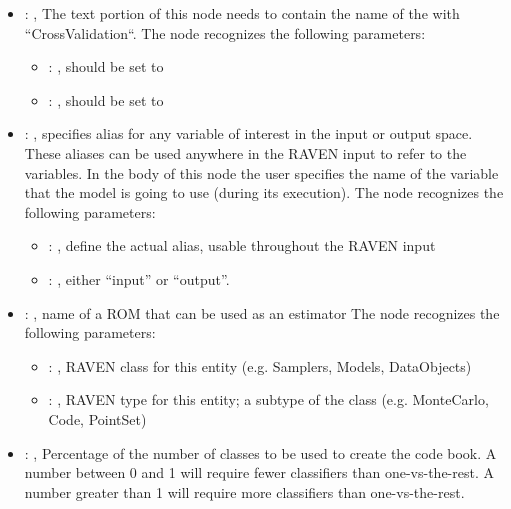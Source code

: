 \begin{itemize}
    \item {}: , 
      The text portion of this node needs to contain the name of the  with
               ``CrossValidation``.
      The  node recognizes the following parameters:
        \begin{itemize}
          \item {}: , 
            should be set to 
          \item {}: , 
            should be set to 
      \end{itemize}

    \item {}: , 
      specifies alias for         any variable of interest in the input or output space. These
      aliases can be used anywhere in the RAVEN input to         refer to the variables. In the body
      of this node the user specifies the name of the variable that the model is going to use
      (during its execution).
      The  node recognizes the following parameters:
        \begin{itemize}
          \item {}: , 
            define the actual alias, usable throughout the RAVEN input
          \item {}: , 
            either ``input'' or ``output''.
      \end{itemize}

    \item {}: , 
      name of a ROM that can be used as an estimator
      The  node recognizes the following parameters:
        \begin{itemize}
          \item {}: , 
            RAVEN class for this entity (e.g. Samplers, Models, DataObjects)
          \item {}: , 
            RAVEN type for this entity; a subtype of the class (e.g. MonteCarlo, Code, PointSet)
      \end{itemize}

    \item {}: , 
      Percentage of the number of classes to be used to create
      the code book. A number between 0 and 1 will require fewer classifiers
      than one-vs-the-rest. A number greater than 1 will require more classifiers
      than one-vs-the-rest.


\end{itemize}
